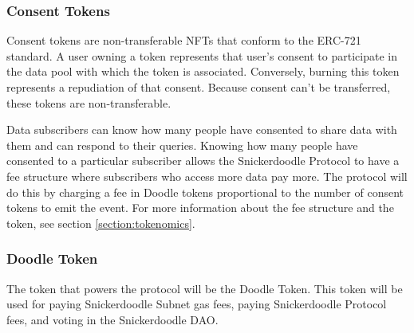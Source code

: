 

\subsubsection{Consent Tokens}
Consent tokens are non-transferable NFTs that conform to the ERC-721 standard. A user owning a token represents that user's consent to participate in the data pool with which the token is associated. Conversely, burning this token represents a repudiation of that consent. Because consent can't be transferred, these tokens are non-transferable.


Data subscribers can know how many people have consented to share data with them and can respond to their queries. Knowing how many people have consented to a particular subscriber allows the Snickerdoodle Protocol to have a fee structure where subscribers who access more data pay more. The protocol will do this by charging a fee in Doodle tokens proportional to the number of consent tokens to emit the event. For more information about the fee structure and the token, see section \ref{section:tokenomics}.

\subsubsection{Doodle Token}
\label{section:DoodleToken}
The token that powers the protocol will be the Doodle Token. This token will be used for paying Snickerdoodle Subnet gas fees, paying Snickerdoodle Protocol fees, and voting in the Snickerdoodle DAO. 

